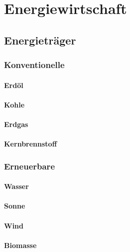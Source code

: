 \section{Energiewirtschaft}

\subsection{Energieträger}

\subsubsection{Konventionelle}

\paragraph{Erdöl}

\paragraph{Kohle}

\paragraph{Erdgas}

\paragraph{Kernbrennstoff}

\subsubsection{Erneuerbare}

\paragraph{Wasser}

\paragraph{Sonne}

\paragraph{Wind}

\paragraph{Biomasse}

